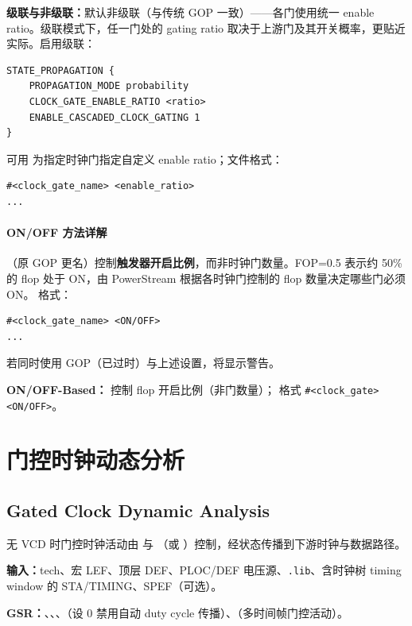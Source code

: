\textbf{级联与非级联：}默认非级联（与传统 GOP 一致）——各门使用统一 enable ratio。级联模式下，任一门处的 gating ratio 取决于上游门及其开关概率，更贴近实际。启用级联：
\begin{lstlisting}
STATE_PROPAGATION {
    PROPAGATION_MODE probability
    CLOCK_GATE_ENABLE_RATIO <ratio>
    ENABLE_CASCADED_CLOCK_GATING 1
}
\end{lstlisting}

可用  为指定时钟门指定自定义 enable ratio；文件格式：
\begin{lstlisting}
#<clock_gate_name> <enable_ratio>
...
\end{lstlisting}

\paragraph{ON/OFF 方法详解}
（原 GOP 更名）控制\textbf{触发器开启比例}，而非时钟门数量。FOP=0.5 表示约 50\% 的 flop 处于 ON，由 PowerStream 根据各时钟门控制的 flop 数量决定哪些门必须 ON。 格式：
\begin{lstlisting}
#<clock_gate_name> <ON/OFF>
...
\end{lstlisting}
若同时使用 GOP（已过时）与上述设置，将显示警告。


\textbf{ON/OFF-Based：} 控制 flop 开启比例（非门数量）； 格式 \texttt{\#<clock\_gate> <ON/OFF>}。

\section{门控时钟动态分析}
\subsection*{Gated Clock Dynamic Analysis}

无 VCD 时门控时钟活动由  与 （或 ）控制，经状态传播到下游时钟与数据路径。

\textbf{输入：}tech、宏 LEF、顶层 DEF、PLOC/DEF 电压源、\texttt{.lib}、含时钟树 timing window 的 STA/TIMING、SPEF（可选）。

\textbf{GSR：}、、、（设 0 禁用自动 duty cycle 传播）、（多时间帧门控活动）。

